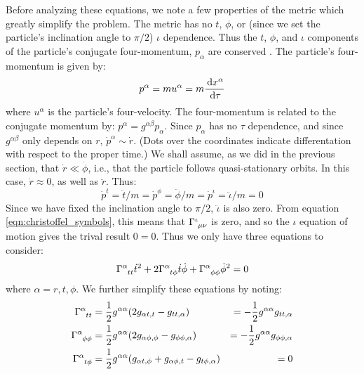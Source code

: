 Before analyzing these equations, we note a few properties of the metric which greatly simplify the problem. The metric has no $t$, $\phi$, or (since we set the particle's inclination angle to $\pi/2$) $\iota$ dependence. Thus the $t$, $\phi$, and $\iota$ components of the particle's conjugate four-momentum, $p_\alpha$ are conserved \cite{ref:MTW, ref:Schutz, ref:Carroll}. The particle's four-momentum is given by:
\begin{equation}
p^{\alpha} = m u^{\alpha} = m \frac{\,\mathrm{d} x^\alpha}{\,\mathrm{d}\tau}
\end{equation}
where $u^{\alpha}$ is the particle's four-velocity. The four-momentum is related to the conjugate momentum by: $p^{\alpha} = g^{\alpha\beta}p_{\alpha}$. Since $p_{\alpha}$ has no $\tau$ dependence, and since $g^{\alpha\beta}$ only depends on $r$, $\dot{p}^{\alpha} \sim \dot{r}$. (Dots over the coordinates indicate differentation with respect to the proper time.) We shall assume, as we did in the previous section, that $\dot{r} \ll \dot{\phi}$, i.e., that the particle follows quasi-stationary orbits. In this case, $\dot{r} \approx 0$, as well as $\ddot{r}$. Thus: 
\begin{equation}
\dot{p}^t = \ddot{t}/m = \dot{p}^\phi = \ddot{\phi}/m = \dot{p}^\iota = \ddot{\iota}/m = 0
\end{equation}
Since we have fixed the inclination angle to $\pi/2$, $\ddot{\iota}$ is also zero. From equation \ref{eqn:christoffel_symbols}, this means that $\Gamma\indices{^\iota_{\mu\nu}}$ is zero, and so the $\iota$ equation of motion gives the trival result $0 = 0$. Thus we only have three equations to consider:
\begin{equation}
\label{eqn:equations_of_motion}
\Gamma\indices{^\alpha_{tt}} \dot{t}^2 + 2\Gamma\indices{^\alpha_{t\phi}}\dot{t}\dot{\phi} + \Gamma\indices{^\alpha_{\phi\phi}} \dot{\phi}^2 = 0 
\end{equation}
where $\alpha = r,t,\phi$. We further simplify these equations by noting:
\begin{align*}
\Gamma\indices{^\alpha_{tt}} &= \frac{1}{2} g^{\alpha\alpha}(2g_{\alpha t,t} - g_{tt,\alpha}) &= -\frac{1}{2} g^{\alpha\alpha}g_{tt,\alpha} \\
\Gamma\indices{^\alpha_{\phi\phi}} &= \frac{1}{2} g^{\alpha\alpha}(2g_{\alpha \phi,\phi} - g_{\phi\phi,\alpha}) &= -\frac{1}{2} g^{\alpha\alpha}g_{\phi\phi,\alpha} \\
\Gamma\indices{^\alpha_{t\phi}} &= \frac{1}{2} g^{\alpha\alpha}(g_{\alpha t,\phi} + g_{\alpha \phi,t} - g_{t\phi,\alpha}) &= 0 \\
\end{align*}

